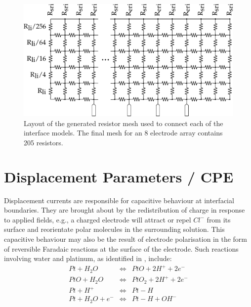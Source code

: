 \documentclass[journal, a4paper]{IEEEtran}
\begin{document}
\begin{figure}
    \begin{center}
        \includegraphics[width=\columnwidth]{graphics/resistorMesh_sideways}
    \end{center}
    \caption{Layout of the generated resistor mesh used to connect each of the interface models. The final mesh for an 8 electrode array contains 205 resistors.}
    \label{fig:mesh}
\end{figure}



\section{Displacement Parameters / CPE}
\label{sect:cpe}
Displacement currents are responsible for capacitive behaviour at interfacial boundaries.
They are brought about by the redistribution of charge in response to applied fields, e.g., a charged electrode will attract or repel $Cl^{-}$ from its surface and reorientate polar molecules in the surrounding solution. \cite{Merrill05}
This capacitive behaviour may also be the result of electrode polarisation in the form of reversible Faradaic reactions at the surface of the electrode.
Such reactions involving water and platinum, as identified in \cite{Horch2004,Mohtashami2011,Merrill05}, include:
\begin{eqnarray}
    Pt + H_{2}O &\Leftrightarrow& PtO + 2 H^{+} + 2 e^{-}\\
    PtO + H_{2}O &\Leftrightarrow& PtO_{2} + 2 H^{+} + 2e^{-}\\
    Pt + H^{+} & \Leftrightarrow & Pt-H\\
    Pt + H_{2}O + e^{-} &\Leftrightarrow& Pt-H+OH^{-}
\end{eqnarray}
\end{document}
